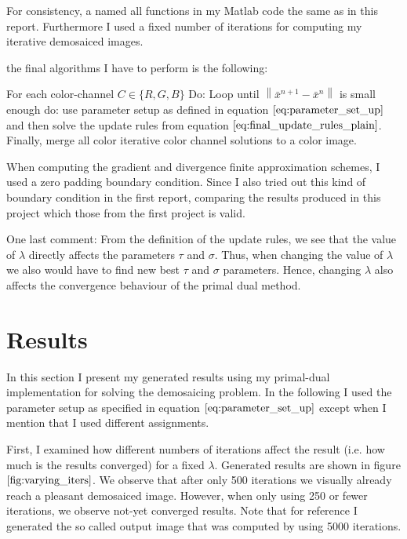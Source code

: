 \documentclass{paper}
\newcommand{\norm}[1]{\left\lVert#1\right\rVert}
\begin{document}
For consistency, a named all functions in my Matlab code the same as in this report. Furthermore I used a fixed number of iterations for computing my iterative demosaiced images.

the final algorithms I have to perform is the following:

For each color-channel $C \in \{R,G,B\}$ Do: Loop until $\norm{\bar{x}^{n+1} - \bar{x}^{n}}$ is small enough do: use parameter setup as defined in equation $\ref{eq:parameter_set_up}$ and then solve the update rules from equation $\ref{eq:final_update_rules_plain}$. Finally, merge all color iterative color channel solutions to a color image.

When computing the gradient and divergence finite approximation schemes, I used a zero padding boundary condition. Since I also tried out this kind of boundary condition in the first report, comparing the results produced in this project which those from the first project is valid.

One last comment: From the definition of the update rules, we see that the value of $\lambda$ directly affects the parameters $\tau$ and $\sigma$. Thus, when changing the value of $\lambda$ we also would have to find new best $\tau$ and $\sigma$ parameters. Hence, changing $\lambda$ also affects the convergence behaviour of the primal dual method. 

\section{Results}

In this section I present my generated results using my primal-dual implementation for solving the demosaicing problem.
In the following I used the parameter setup as specified in equation $\ref{eq:parameter_set_up}	$ except when I mention that I used different assignments.

First, I examined how different numbers of iterations affect the result (i.e. how much is the results converged) for a fixed $\lambda$. Generated results are shown in figure $\ref{fig:varying_iters}$. We observe that after only 500 iterations we visually already reach a pleasant demosaiced image. However, when only using 250 or fewer iterations, we observe not-yet converged results. Note that for reference I generated the so called output image that was computed by using 5000 iterations.
\end{document}
